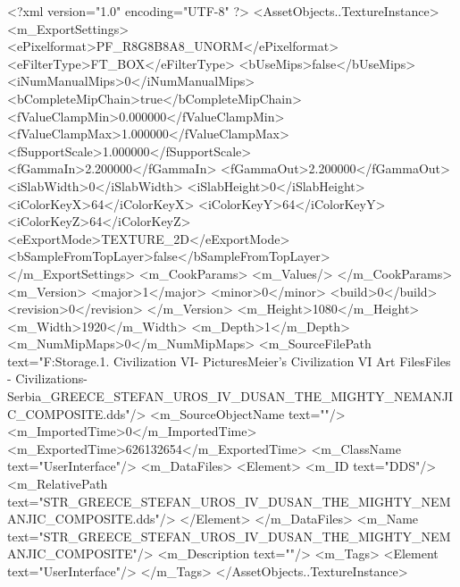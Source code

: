 <?xml version="1.0" encoding="UTF-8" ?>
<AssetObjects..TextureInstance>
	<m_ExportSettings>
		<ePixelformat>PF_R8G8B8A8_UNORM</ePixelformat>
		<eFilterType>FT_BOX</eFilterType>
		<bUseMips>false</bUseMips>
		<iNumManualMips>0</iNumManualMips>
		<bCompleteMipChain>true</bCompleteMipChain>
		<fValueClampMin>0.000000</fValueClampMin>
		<fValueClampMax>1.000000</fValueClampMax>
		<fSupportScale>1.000000</fSupportScale>
		<fGammaIn>2.200000</fGammaIn>
		<fGammaOut>2.200000</fGammaOut>
		<iSlabWidth>0</iSlabWidth>
		<iSlabHeight>0</iSlabHeight>
		<iColorKeyX>64</iColorKeyX>
		<iColorKeyY>64</iColorKeyY>
		<iColorKeyZ>64</iColorKeyZ>
		<eExportMode>TEXTURE_2D</eExportMode>
		<bSampleFromTopLayer>false</bSampleFromTopLayer>
	</m_ExportSettings>
	<m_CookParams>
		<m_Values/>
	</m_CookParams>
	<m_Version>
		<major>1</major>
		<minor>0</minor>
		<build>0</build>
		<revision>0</revision>
	</m_Version>
	<m_Height>1080</m_Height>
	<m_Width>1920</m_Width>
	<m_Depth>1</m_Depth>
	<m_NumMipMaps>0</m_NumMipMaps>
	<m_SourceFilePath text="F:\Mod Storage\2.1. Civilization VI\Mods\Archive - Pictures\Sid Meier's Civilization VI Art Files\Art Files - Civilizations\Civilization - Serbia\STR_GREECE_STEFAN_UROS_IV_DUSAN_THE_MIGHTY_NEMANJIC_COMPOSITE.dds"/>
	<m_SourceObjectName text=""/>
	<m_ImportedTime>0</m_ImportedTime>
	<m_ExportedTime>626132654</m_ExportedTime>
	<m_ClassName text="UserInterface"/>
	<m_DataFiles>
		<Element>
			<m_ID text="DDS"/>
			<m_RelativePath text="STR_GREECE_STEFAN_UROS_IV_DUSAN_THE_MIGHTY_NEMANJIC_COMPOSITE.dds"/>
		</Element>
	</m_DataFiles>
	<m_Name text="STR_GREECE_STEFAN_UROS_IV_DUSAN_THE_MIGHTY_NEMANJIC_COMPOSITE"/>
	<m_Description text=""/>
	<m_Tags>
		<Element text="UserInterface"/>
	</m_Tags>
</AssetObjects..TextureInstance>

